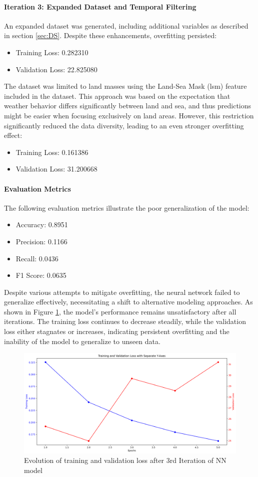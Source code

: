 \documentclass[8pt,a4paper]{article}
\begin{document}
\paragraph{Iteration 3: Expanded Dataset and Temporal Filtering}
An expanded dataset was generated, including additional variables as described in section \ref{sec:DS}. Despite these enhancements, overfitting persisted:
\begin{itemize}
    \item Training Loss: 0.282310
    \item Validation Loss: 22.825080
\end{itemize}
The dataset was limited to land masses using the Land-Sea Mask (lsm) feature included in the dataset. This approach was based on the expectation that weather behavior differs significantly between land and sea, and thus predictions might be easier when focusing exclusively on land areas. However, this restriction significantly reduced the data diversity, leading to an even stronger overfitting effect:
\begin{itemize}
    \item Training Loss: 0.161386
    \item Validation Loss: 31.200668
\end{itemize}
\paragraph{Evaluation Metrics}
The following evaluation metrics illustrate the poor generalization of the model:
\begin{itemize}
    \item Accuracy: 0.8951
    \item Precision: 0.1166
    \item Recall: 0.0436
    \item F1 Score: 0.0635
\end{itemize}
Despite various attempts to mitigate overfitting, the neural network failed to generalize effectively, necessitating a shift to alternative modeling approaches. As shown in Figure \ref{fig:It3}, the model's performance remains unsatisfactory after all iterations. The training loss continues to decrease steadily, while the validation loss either stagnates or increases, indicating persistent overfitting and the inability of the model to generalize to unseen data.
\begin{figure}[h]
    \centering
    \includegraphics[width=\textwidth]{../training_validation_loss_Iteration3.png}
    \caption{Evolution of training and validation loss after 3rd Iteration of NN model}
    \label{fig:It3}
\end{figure}
\end{document}
